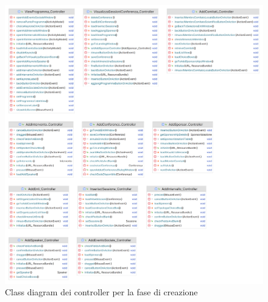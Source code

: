 \begin{figure}[h!]
	\includegraphics[scale=0.17]{Immagini/Controller_Creazione.png}
	\caption{Class diagram dei controller per la fase di creazione}
\end{figure}
\newpage

